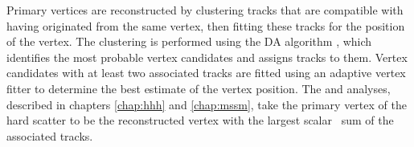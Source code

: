 \enlargethispage{\baselineskip}
Primary vertices are reconstructed by clustering
tracks that are compatible with having originated from the same vertex, then fitting 
these tracks for the position of the vertex. The clustering 
is performed using the \ac{DA} algorithm \cite{vtx-da}, which identifies
the most probable vertex candidates and assigns tracks to them. Vertex
candidates with at least two associated tracks are fitted using an adaptive
vertex fitter \cite{vtx-adaptivefit} to determine the best estimate of the 
vertex position. The \Htohhtobbtautau and \AHtotautau analyses, described in chapters \ref{chap:hhh} and \ref{chap:mssm},
take the primary
vertex of the hard scatter to be the reconstructed vertex with the largest scalar \pT~sum of the associated
tracks. %

